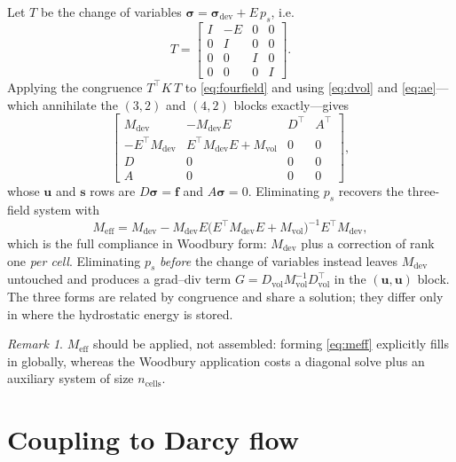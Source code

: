 \documentclass[11pt,a4paper]{article}
\newcommand{\dev}{\mathrm{dev}}
\newcommand{\bsig}{\boldsymbol{\sigma}}
\newcommand{\bu}{\boldsymbol{u}}
\theoremstyle{plain}
\theoremstyle{remark}
\newtheorem{remark}{Remark}
\begin{document}
Let $T$ be the change of variables $\bsig = \bsig_{\dev} + E\,p_s$, i.e.
\begin{equation}
  T = \begin{bmatrix} I & -E & 0 & 0\\ 0&I&0&0\\ 0&0&I&0\\ 0&0&0&I\end{bmatrix}.
\end{equation}
Applying the congruence $T^{\!\top}\!K\,T$ to \eqref{eq:fourfield} and using
\eqref{eq:dvol} and \eqref{eq:ae}---which annihilate the $(3,2)$ and $(4,2)$
blocks exactly---gives
\begin{equation}
  \begin{bmatrix}
    M_{\dev} & -M_{\dev}E & D^{\!\top} & A^{\!\top}\\
    -E^{\!\top}\!M_{\dev} & E^{\!\top}\!M_{\dev}E + M_{\mathrm{vol}} & 0 & 0\\
    D & 0 & 0 & 0\\
    A & 0 & 0 & 0
  \end{bmatrix},
\end{equation}
whose $\bu$ and $\boldsymbol{s}$ rows are $D\bsig=\boldsymbol{f}$ and
$A\bsig=0$. Eliminating $p_s$ recovers the three-field system with
\begin{equation}
  M_{\mathrm{eff}}
  = M_{\dev} - M_{\dev}E\bigl(E^{\!\top}\!M_{\dev}E + M_{\mathrm{vol}}\bigr)^{-1}
    E^{\!\top}\!M_{\dev},
  \label{eq:meff}
\end{equation}
which is the full compliance in Woodbury form: $M_{\dev}$ plus a correction of
rank one \emph{per cell}. Eliminating $p_s$ \emph{before} the change of
variables instead leaves $M_{\dev}$ untouched and produces a grad--div term
$G = D_{\mathrm{vol}}M_{\mathrm{vol}}^{-1}D_{\mathrm{vol}}^{\!\top}$ in the
$(\bu,\bu)$ block. The three forms are related by congruence and share a
solution; they differ only in where the hydrostatic energy is stored.

\begin{remark}
$M_{\mathrm{eff}}$ should be applied, not assembled: forming
\eqref{eq:meff} explicitly fills in globally, whereas the Woodbury application
costs a diagonal solve plus an auxiliary system of size $n_{\text{cells}}$.
\end{remark}

\section{Coupling to Darcy flow}
\end{document}
